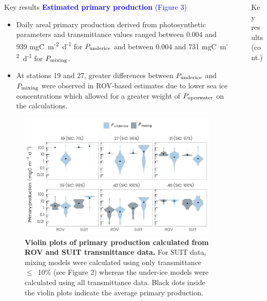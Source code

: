 \documentclass[final]{beamer}
\newlength{\sepwidth}
\newlength{\colwidth}
\newcommand{\separatorcolumn}{\begin{column}{\sepwidth}\end{column}}
\newcommand{\ppopenwater}{\ensuremath{P_{\text{\scriptsize openwater}}}}
\newcommand{\ppmixing}{\ensuremath{P_{\text{\scriptsize mixing}}}}
\newcommand{\ppunderice}{\ensuremath{P_{\text{\scriptsize underice}}}}
\newcommand{\dailypp}{mgC~m\textsuperscript{-2}~d\textsuperscript{-1}}
\begin{document}
\begin{frame}[t]
\begin{columns}[t]
\begin{column}{\colwidth}
\begin{block}{Key results}
				\textcolor{blue}{\large \textbf{Estimated primary production} (Figure 3)}
				\begin{itemize}
					\justifying
					\setlength\itemsep{1em}
					\item Daily areal primary production derived from photosynthetic parameters and transmittance values ranged between 0.004 and 939 \dailypp{} for \ppunderice{} and between 0.004 and 731 \dailypp{} for \ppmixing{}.
					\item At stations 19 and 27, greater differences between \ppunderice{} and \ppmixing{} were observed in ROV-based estimates due to lower sea ice concentrations which allowed for a greater weight of \ppopenwater{} on the calculations.
				\end{itemize}

				\begin{figure}
					\centering
					\includegraphics[scale = 1.75]{graphs/fig5.pdf}
					\caption{\textbf{Violin plots of primary production calculated from ROV and SUIT transmittance data.} For SUIT data, mixing models were calculated using only transmittance~$\le$~10\% (see Figure 2) whereas the under-ice models were calculated using all transmittance data. Black dots inside the violin plots indicate the average primary production.}
				\end{figure}

			\end{block}

		\end{column}

		\separatorcolumn

		\begin{column}{\colwidth}

			\begin{block}{Key results (cont.)}


\end{block}
\end{column}
\end{columns}
\end{frame}
\end{document}
